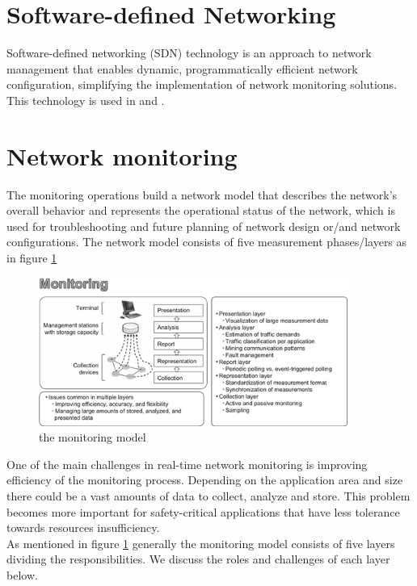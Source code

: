\section{Software-defined Networking}
Software-defined networking (SDN) technology is an approach to network management that enables dynamic, programmatically efficient
network configuration, simplifying the implementation of network monitoring solutions. This technology is used in \cite{6838227} and \cite{8869206}.\\

\section{Network monitoring}
The monitoring operations build a network model that describes the network's overall behavior and represents the operational status of the network, which is used for troubleshooting
and future planning of network design or/and network configurations.
The network model consists of five measurement phases/layers as in figure \ref{fig:monitoring-model} \cite{LEE201484}

\begin{figure}[H]
    \centering
    \includegraphics[width=0.9\textwidth]{resources/images/monitoring_model.png}
    \caption{the monitoring model \cite{LEE201484}}
    \label{fig:monitoring-model}
\end{figure}

One of the main challenges in real-time network monitoring is improving efficiency of the monitoring process.
Depending on the application area and size there could be a vast amounts of data to collect, analyze and store.
This problem becomes more important for safety-critical applications that have less tolerance towards resources insufficiency.\\
As mentioned in figure \ref{fig:monitoring-model} generally the monitoring model consists of five layers dividing
the responsibilities. We discuss the roles and challenges of each layer below.

